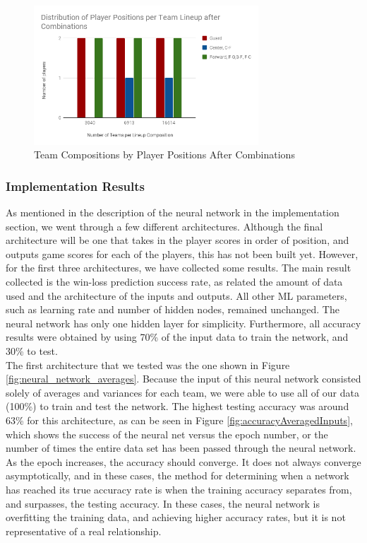 \begin{figure}[ht]
    \centering
    \includegraphics[width=0.75\textwidth]{figures/distributionAfterCombination}
    \caption{Team Compositions by Player Positions After Combinations}
    \label{fig:distributionAfterCombination}
\end{figure}

\subsubsection{Implementation Results}
As mentioned in the description of the neural network in the implementation section, we went through a few different architectures. Although the final architecture will be one that takes in the player scores in order of position, and outputs game scores for each of the players, this has not been built yet. However, for the first three architectures, we have collected some results. The main result collected is the win-loss prediction success rate, as related the amount of data used and the architecture of the inputs and outputs. All other ML parameters, such as learning rate and number of hidden nodes, remained unchanged. The neural network has only one hidden layer for simplicity. Furthermore, all accuracy results were obtained by using 70\% of the input data to train the network, and 30\% to test.\\

The first architecture that we tested was the one shown in Figure \ref{fig:neural_network_averages}. Because the input of this neural network consisted solely of averages and variances for each team, we were able to use all of our data (100\%) to train and test the network. The highest testing accuracy was around 63\% for this architecture, as can be seen in Figure \ref{fig:accuracyAveragedInputs}, which shows the success of the neural net versus the epoch number, or the number of times the entire data set has been passed through the neural network. As the epoch increases, the accuracy should converge. It does not always converge asymptotically, and in these cases, the method for determining when a network has reached its true accuracy rate is when the training accuracy separates from, and surpasses, the testing accuracy. In these cases, the neural network is overfitting the training data, and achieving higher accuracy rates, but it is not representative of a real relationship.

